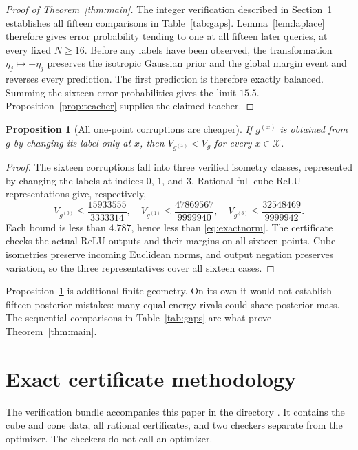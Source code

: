 \documentclass[11pt]{article}
\newtheorem{proposition}[theorem]{Proposition}
\theoremstyle{remark}\newtheorem{remark}[theorem]{Remark}
\newcommand{\X}{\mathcal X}
\newcommand{\1}{\mathbf 1}
\begin{document}
\begin{proof}[Proof of Theorem~\ref{thm:main}]
The integer verification described in Section~\ref{sec:verification} establishes all fifteen comparisons in Table~\ref{tab:gaps}. Lemma~\ref{lem:laplace} therefore gives error probability tending to one at all fifteen later queries, at every fixed $N\ge16$. Before any labels have been observed, the transformation $\eta_j\mapsto-\eta_j$ preserves the isotropic Gaussian prior and the global margin event and reverses every prediction. The first prediction is therefore exactly balanced. Summing the sixteen error probabilities gives the limit $15.5$. Proposition~\ref{prop:teacher} supplies the claimed teacher.
\end{proof}

\begin{proposition}[All one-point corruptions are cheaper]\label{prop:stars}
If $g^{(x)}$ is obtained from $g$ by changing its label only at $x$, then $V_{g^{(x)}}<V_g$ for every $x\in\X$.
\end{proposition}
\begin{proof}
The sixteen corruptions fall into three verified isometry classes, represented by changing the labels at indices $0$, $1$, and $3$. Rational full-cube ReLU representations give, respectively,
\[
V_{g^{(0)}}\le\frac{15933555}{3333314},\quad
V_{g^{(1)}}\le\frac{47869567}{9999940},\quad
V_{g^{(3)}}\le\frac{32548469}{9999942}.
\]
Each bound is less than $4.787$, hence less than \eqref{eq:exactnorm}. The certificate checks the actual ReLU outputs and their margins on all sixteen points. Cube isometries preserve incoming Euclidean norms, and output negation preserves variation, so the three representatives cover all sixteen cases.
\end{proof}

Proposition~\ref{prop:stars} is additional finite geometry. On its own it would not establish fifteen posterior mistakes: many equal-energy rivals could share posterior mass. The sequential comparisons in Table~\ref{tab:gaps} are what prove Theorem~\ref{thm:main}.

\section{Exact certificate methodology}\label{sec:verification}
The verification bundle accompanies this paper in the directory . It contains the cube and cone data, all rational certificates, and two checkers separate from the optimizer. The checkers do not call an optimizer.
\end{document}
